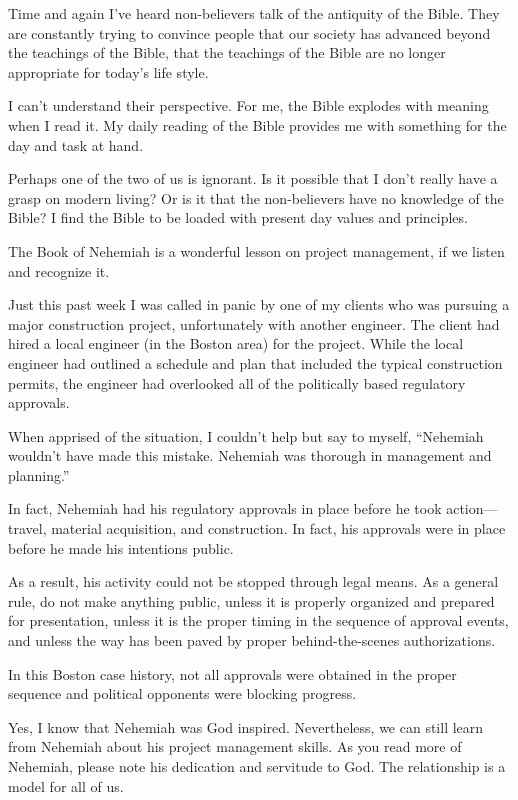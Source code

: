 \documentclass[12pt]{memoir}
\begin{document}
Time and again I've heard non-believers talk of
the antiquity of the Bible. They are constantly trying to convince
people that our society has advanced beyond the teachings of the Bible,
that the teachings of the Bible are no longer appropriate for today's
life style.

I can't understand their perspective. For me, the Bible explodes with meaning when I read it. My daily reading of the Bible provides me with something for the day and task at hand.

Perhaps one of the two of us is ignorant. Is it possible that I don't
really have a grasp on modern living? Or is it that the non-believers
have no knowledge of the Bible? I find the Bible to be loaded with
present day values and principles.

The Book of Nehemiah is a wonderful lesson on project management, if we listen and recognize it. %

Just this past week I was called in panic by one of my clients who
was pursuing a major construction project, unfortunately with another
engineer. The client had hired a local engineer (in the Boston area)
for the project. While the local engineer had outlined a schedule
and plan that included the typical construction permits, the engineer
had overlooked all of the politically based regulatory approvals.

When apprised of the situation, I couldn't help but say to myself, ``Nehemiah wouldn't have made this mistake. Nehemiah was thorough in management and planning.''

In fact, Nehemiah had his regulatory approvals in place before
he took action---travel, material acquisition, and construction.
In fact, his approvals were in place before he made his intentions
public.

As a result, his activity could not be stopped through legal means. As a general rule, do not make anything public, unless it is properly organized and prepared for presentation, unless it is the proper timing in the sequence of approval events, and unless the way has been paved by proper behind-the-scenes authorizations.

In this Boston case history, not all approvals were obtained in the proper sequence and political opponents were blocking progress.

Yes, I know that Nehemiah was God inspired. Nevertheless, we can still learn from Nehemiah about his project management skills. As you read more of Nehemiah, please note his dedication and servitude to God. The relationship is a model for all of us.
\end{document}
